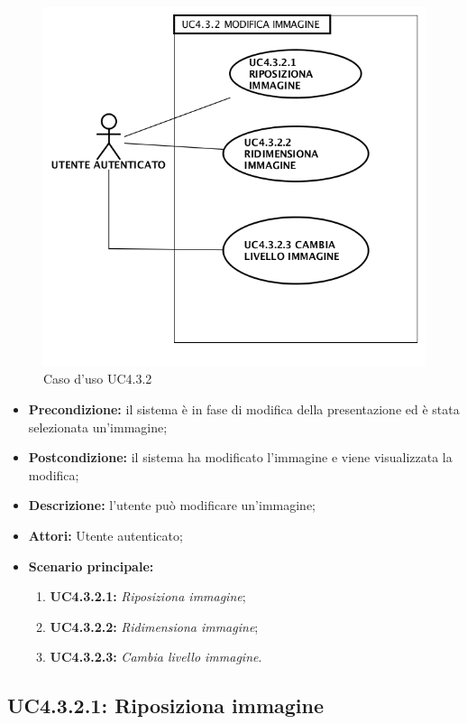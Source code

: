 \begin{figure}[H]
	\begin{center}
	\includegraphics[scale=0.4]{diagram/UC4-3-2.png}
	\caption{Caso d'uso UC4.3.2}
	\end{center}
\end{figure}
\begin{itemize}
	\item \textbf{Precondizione:} il sistema è in fase di modifica della presentazione ed è stata selezionata un'immagine;
	\item \textbf{Postcondizione:} il sistema ha modificato l'immagine e viene visualizzata la modifica;
	\item \textbf{Descrizione:} l'utente può modificare un'immagine;
	\item \textbf{Attori:} Utente autenticato;
	\item \textbf{Scenario principale:}
	\begin{enumerate}
		\item \textbf{ UC4.3.2.1:} \textit{ Riposiziona immagine};
		\item \textbf{ UC4.3.2.2:} \textit{ Ridimensiona immagine};
		\item \textbf{ UC4.3.2.3:} \textit{ Cambia livello immagine}.
	\end{enumerate}
\end{itemize}
\subsection{ UC4.3.2.1: Riposiziona immagine}

